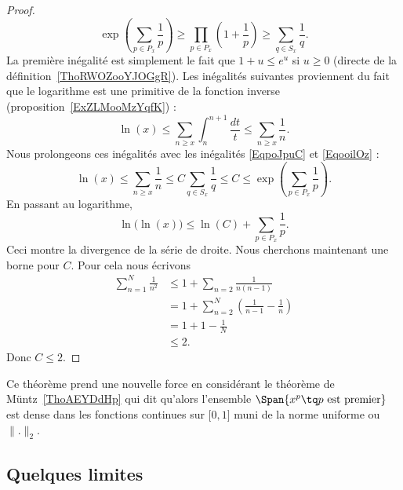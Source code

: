 \begin{proof}
\begin{equation}
        \exp\left( \sum_{p\in P_x}\frac{1}{ p } \right)\geq\prod_{p\in P_x}\left( 1+\frac{1}{ p } \right)\geq \sum_{q\in S_x}\frac{1}{ q }.
    \end{equation}
    La première inégalité est simplement le fait que \( 1+u\leq e^u\) si \( u\geq 0\) (directe de la définition~\ref{ThoRWOZooYJOGgR}). Les inégalités suivantes proviennent du fait que le logarithme est une primitive de la fonction inverse (proposition~\ref{ExZLMooMzYqfK}) :
    \begin{equation}
        \ln(x)\leq \sum_{n\geq x}\int_{n}^{n+1}\frac{dt}{ t }\leq \sum_{n\geq x}\frac{1}{ n }.
    \end{equation}
    Nous prolongeons ces inégalités avec les inégalités \eqref{EqpoJpuC} et \eqref{EqooilOz} :
    \begin{equation}
        \ln(x)\leq \sum_{n\geq x}\frac{1}{ n }\leq C\sum_{q\in S_x}\frac{1}{ q }\leq C\leq \exp\left( \sum_{p\in P_x}\frac{1}{ p } \right).
    \end{equation}
    En passant au logarithme,
    \begin{equation}
        \ln\big( \ln(x) \big)\leq\ln(C)+\sum_{p\in P_x}\frac{1}{ p }.
    \end{equation}
    Ceci montre la divergence de la série de droite. Nous cherchons maintenant une borne pour \( C\). Pour cela nous écrivons
    \begin{subequations}
        \begin{align}
            \sum_{n=1}^N\frac{1}{ n^2 }&\leq 1+\sum_{n=2}\frac{1}{ n(n-1) }\\
            &=1+\sum_{n=2}^N\left( \frac{1}{ n-1 }-\frac{1}{ n } \right)\\
            &=1+1-\frac{1}{ N }\\
            &\leq 2.
        \end{align}
    \end{subequations}
    Donc \( C\leq 2\).
\end{proof}
Ce théorème prend une nouvelle force en considérant le théorème de Müntz~\ref{ThoAEYDdHp} qui dit qu'alors l'ensemble \( \Span\{ x^p\tq  p\text{ est premier} \}\) est dense dans les fonctions continues sur \( \mathopen[ 0 , 1 \mathclose]\) muni de la norme uniforme ou \( \| . \|_2\).

\subsection{Quelques limites}

